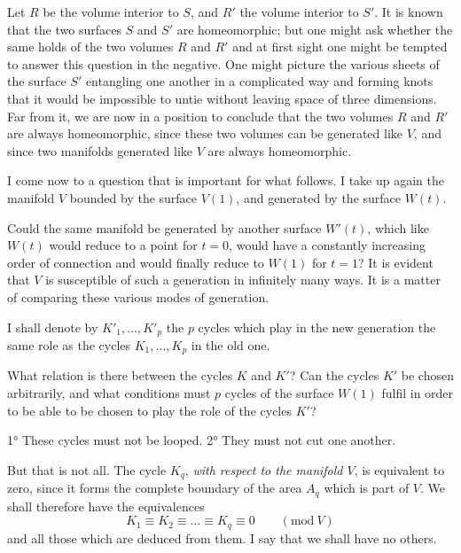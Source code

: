 \documentclass{article}
\begin{document}

Let $R$ be the volume interior to $S$, and $R'$ the volume interior to $S'$. It is known that the two surfaces $S$ and $S'$ are homeomorphic; but one might ask whether the same holds of the two volumes $R$ and $R'$ and at first sight one might be tempted to answer this question in the negative. One might picture the various sheets of the surface $S'$ entangling one another in a complicated way and forming knots that it would be impossible to untie without leaving space of three dimensions. Far from it, we are now in a position to conclude that the two volumes $R$ and $R'$ are always homeomorphic, since these two volumes can be generated like $V$, and since two manifolds generated like $V$ are always homeomorphic.

I come now to a question that is important for what follows. I take up again the manifold $V$ bounded by the surface $V(1)$, and generated by the surface $W(t)$.

Could the same manifold be generated by another surface $W'(t)$, which like $W(t)$ would reduce to a point for $t = 0$, would have a constantly increasing order of connection and would finally reduce to $W(1)$ for $t = 1$? It is evident that $V$ is susceptible of such a generation in infinitely many ways. It is a matter of comparing these various modes of generation.

I shall denote by $K'_{1}, \ldots, K'_{p}$ the $p$ cycles which play in the new generation the same role as the cycles $K_{1}, \ldots, K_{p}$ in the old one.

What relation is there between the cycles $K$ and $K'$? Can the cycles $K'$ be chosen arbitrarily, and what conditions must $p$ cycles of the surface $W(1)$ fulfil in order to be able to be chosen to play the role of the cycles $K'$?

1° These cycles must not be looped. 2° They must not cut one another.

But that is not all. The cycle $K_{q}$, \emph{with respect to the manifold $V$}, is equivalent to zero, since it forms the complete boundary of the area $A_{q}$ which is part of $V$. We shall therefore have the equivalences
\[ K_{1} \equiv K_{2} \equiv \ldots \equiv K_{q} \equiv 0 \qquad (\text{mod}\ V) \tag{1} \]
and all those which are deduced from them. I say that we shall have no others.
\end{document}
